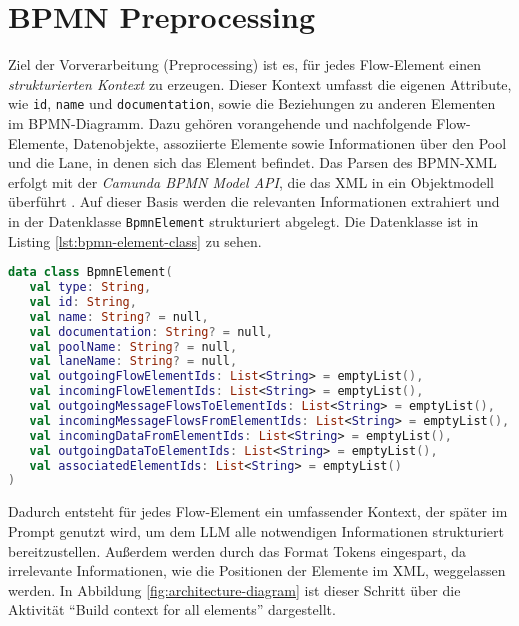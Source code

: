 \section{BPMN Preprocessing}\label{sec:bpmn-preprocessing}

Ziel der Vorverarbeitung (Preprocessing) ist es, für jedes Flow-Element einen \emph{strukturierten Kontext} zu erzeugen. Dieser Kontext umfasst die eigenen Attribute, wie \texttt{id}, \texttt{name} und \texttt{documentation}, sowie die Beziehungen zu anderen Elementen im \ac{BPMN}-Diagramm. Dazu gehören vorangehende und nachfolgende Flow-Elemente, Datenobjekte, assoziierte Elemente sowie Informationen über den Pool und die Lane, in denen sich das Element befindet. Das Parsen des \ac{BPMN}-XML erfolgt mit der \emph{Camunda BPMN Model API}, die das XML in ein Objektmodell überführt \cite{camunda-bpmn-model-api, camunda-bpmn-model-read}. Auf dieser Basis werden die relevanten Informationen extrahiert und in der Datenklasse \texttt{BpmnElement} strukturiert abgelegt. Die Datenklasse ist in Listing \ref{lst:bpmn-element-class} zu sehen.

\begin{lstlisting}[language=Kotlin,caption={Interne \ac{BPMN}-Repräsentation je Flow-Element.},label={lst:bpmn-element-class}]
data class BpmnElement(
   val type: String,
   val id: String,
   val name: String? = null,
   val documentation: String? = null,
   val poolName: String? = null,
   val laneName: String? = null,
   val outgoingFlowElementIds: List<String> = emptyList(),
   val incomingFlowElementIds: List<String> = emptyList(),
   val outgoingMessageFlowsToElementIds: List<String> = emptyList(),
   val incomingMessageFlowsFromElementIds: List<String> = emptyList(),
   val incomingDataFromElementIds: List<String> = emptyList(),
   val outgoingDataToElementIds: List<String> = emptyList(),
   val associatedElementIds: List<String> = emptyList()
)
\end{lstlisting}

\newpage
Dadurch entsteht für jedes Flow-Element ein umfassender Kontext, der später im Prompt genutzt wird, um dem \ac{LLM} alle notwendigen Informationen strukturiert bereitzustellen. Außerdem werden durch das Format Tokens eingespart, da irrelevante Informationen, wie die Positionen der Elemente im XML, weggelassen werden. In Abbildung \ref{fig:architecture-diagram} ist dieser Schritt über die Aktivität \enquote{Build context for all elements} dargestellt.